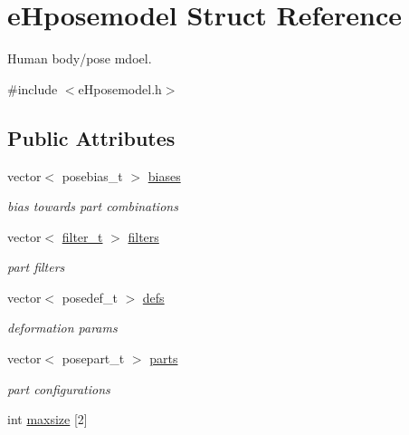 \hypertarget{structeHposemodel}{\section{e\-Hposemodel Struct Reference}
\label{structeHposemodel}
}


Human body/pose mdoel.  




{\ttfamily \#include $<$e\-Hposemodel.\-h$>$}

\subsection*{Public Attributes}
\begin{DoxyCompactItemize}
\item 
\hypertarget{structeHposemodel_a642f5071c21c6d75e7a75445d719f6eb}{vector$<$ posebias\-\_\-t $>$ \hyperlink{structeHposemodel_a642f5071c21c6d75e7a75445d719f6eb}{biases}}\label{structeHposemodel_a642f5071c21c6d75e7a75445d719f6eb}

\begin{DoxyCompactList}\small\item\em bias towards part combinations \end{DoxyCompactList}\item 
vector$<$ \hyperlink{eHfilter_8h_a31d0710a76998e6bea728a5c5ea09538}{filter\-\_\-t} $>$ \hyperlink{structeHposemodel_a689384423c5273b949ac93f0b2906016}{filters}
\begin{DoxyCompactList}\small\item\em part filters \end{DoxyCompactList}\item 
\hypertarget{structeHposemodel_a788922f2f90c6b863fde9ba3b645e8c3}{vector$<$ posedef\-\_\-t $>$ \hyperlink{structeHposemodel_a788922f2f90c6b863fde9ba3b645e8c3}{defs}}\label{structeHposemodel_a788922f2f90c6b863fde9ba3b645e8c3}

\begin{DoxyCompactList}\small\item\em deformation params \end{DoxyCompactList}\item 
\hypertarget{structeHposemodel_a0d1d1dbe1d375b299a1870aef4f1ad48}{vector$<$ posepart\-\_\-t $>$ \hyperlink{structeHposemodel_a0d1d1dbe1d375b299a1870aef4f1ad48}{parts}}\label{structeHposemodel_a0d1d1dbe1d375b299a1870aef4f1ad48}

\begin{DoxyCompactList}\small\item\em part configurations \end{DoxyCompactList}\item 
\hypertarget{structeHposemodel_a433ed08ea1f7bef4659ca6fba49073ea}{int \hyperlink{structeHposemodel_a433ed08ea1f7bef4659ca6fba49073ea}{maxsize} \mbox{[}2\mbox{]}}\label{structeHposemodel_a433ed08ea1f7bef4659ca6fba49073ea}


\end{DoxyCompactItemize}
